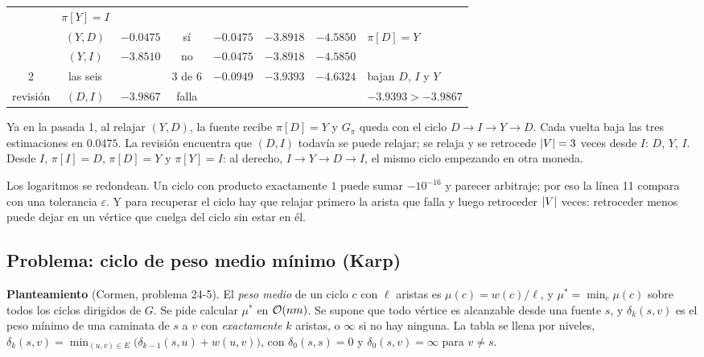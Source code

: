 \documentclass[11pt,letterpaper]{article}
\begin{document}
\begin{ejemplo}
\begin{center}
\begin{tabular}{cccccccl}
      & $\pi[Y] = I$ \\
      & $(Y, D)$ & $-0.0475$ & sí & $-0.0475$ & $-3.8918$
      & $-4.5850$ & $\pi[D] = Y$ \\
      & $(Y, I)$ & $-3.8510$ & no & $-0.0475$ & $-3.8918$
      & $-4.5850$ & \\
    \midrule
    2 & las seis & & 3 de 6 & $-0.0949$ & $-3.9393$ & $-4.6324$
      & bajan $D$, $I$ y $Y$ \\
    \midrule
    revisión & $(D, I)$ & $-3.9867$ & falla & & & &
      $-3.9393 > -3.9867$ \\
    \bottomrule
  \end{tabular}
  \end{center}
  Ya en la pasada 1, al relajar $(Y, D)$, la fuente recibe
  $\pi[D] = Y$ y $G_\pi$ queda con el ciclo $D \to I \to Y \to D$.
  Cada vuelta baja las tres estimaciones en $0.0475$. La revisión
  encuentra que $(D, I)$ todavía se puede relajar; se relaja y se
  retrocede $\left\lvert V \right\rvert = 3$ veces desde $I$: $D$, $Y$, $I$. Desde $I$,
  $\pi[I] = D$, $\pi[D] = Y$ y $\pi[Y] = I$: al derecho,
  $I \to Y \to D \to I$, el mismo ciclo empezando en otra moneda.
\end{ejemplo}

\begin{ojo}
  Los logaritmos se redondean. Un ciclo con producto exactamente $1$
  puede sumar $-10^{-16}$ y parecer arbitraje; por eso la línea 11
  compara con una tolerancia $\varepsilon$. Y para recuperar el ciclo
  hay que relajar primero la arista que falla y luego retroceder
  $\left\lvert V \right\rvert$ veces: retroceder menos puede dejar en un vértice que
  cuelga del ciclo sin estar en él.
\end{ojo}


\subsection*{Problema: ciclo de peso medio mínimo (Karp)}

\textbf{Planteamiento} (Cormen, problema 24-5). El \emph{peso medio}
de un ciclo $c$ con $\ell$ aristas es $\mu(c) = w(c)/\ell$, y
$\mu^* = \min_c \mu(c)$ sobre todos los ciclos dirigidos de $G$. Se
pide calcular $\mu^*$ en $\mathcal{O}\!\left(nm\right)$. Se supone que todo vértice es
alcanzable desde una fuente $s$, y $\delta_k(s, v)$ es el peso mínimo
de una caminata de $s$ a $v$ con \emph{exactamente} $k$ aristas, o
$\infty$ si no hay ninguna. La tabla se llena por niveles,
$\delta_k(s, v) = \min_{(u, v) \in E} \bigl( \delta_{k-1}(s, u) +
w(u, v) \bigr)$, con $\delta_0(s, s) = 0$ y $\delta_0(s, v) = \infty$
para $v \ne s$.
\end{document}

